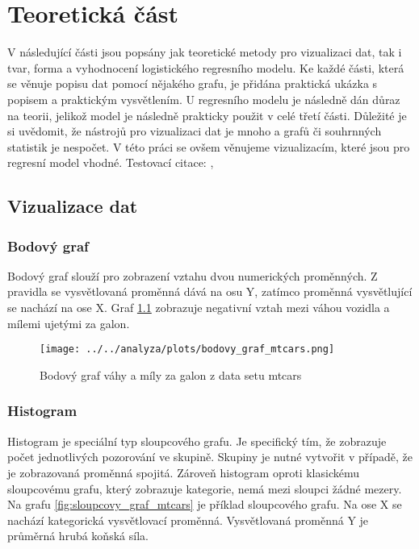 \chapter{Teoretická část}
V následující části jsou popsány jak teoretické metody pro vizualizaci dat, tak i tvar, forma a vyhodnocení logistického regresního modelu. 
Ke každé části, která se věnuje popisu dat pomocí nějakého grafu, je přidána praktická ukázka s popisem a praktickým vysvětlením. U regresního 
modelu je následně dán důraz na teorii, jelikož model je následně prakticky použit v celé třetí části. Důležité je si uvědomit, že nástrojů pro
vizualizaci dat je mnoho a grafů či souhrnných statistik je nespočet. V této práci se ovšem věnujeme vizualizacím, které jsou pro regresní model
vhodné.
Testovací citace: \cite{Hebak2015}, \cite{Kleinbaum2010}

\section{Vizualizace dat}
\subsection{Bodový graf}
Bodový graf slouží pro zobrazení vztahu dvou numerických proměnných. Z pravidla se vysvětlovaná proměnná dává na osu Y,
zatímco proměnná vysvětlující se nachází na ose X. Graf \ref{fig:bodovy_graf_mtcars} zobrazuje negativní vztah mezi
váhou vozidla a mílemi ujetými za galon.

\begin{figure}[H]
    \centering
    \texttt{[image: ../../analyza/plots/bodovy\_graf\_mtcars.png]}
    \caption{Bodový graf váhy a míly za galon z data setu mtcars} 
    \label{fig:bodovy_graf_mtcars}
\end{figure}

\subsection{Histogram}

Histogram je speciální typ sloupcového grafu. Je specifický tím, že zobrazuje počet jednotlivých pozorování ve skupině. Skupiny je nutné vytvořit
v případě, že je zobrazovaná proměnná spojitá. Zároveň histogram oproti klasickému sloupcovému grafu, který zobrazuje kategorie, nemá mezi sloupci žádné mezery.
Na grafu \ref{fig:sloupcovy_graf_mtcars} je příklad sloupcového grafu. Na ose X se nachází kategorická vysvětlovací proměnná. Vysvětlovaná proměnná Y je průměrná hrubá
koňská síla.

